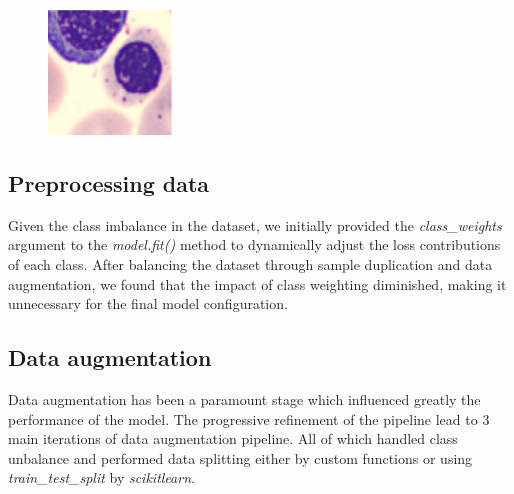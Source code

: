 \documentclass[11pt]{article}
\begin{document}
\begin{figure}[H]
\begin{minipage}{0.2\textwidth}
        \includegraphics[width=\linewidth]{images/ambiguous2.png}
    \end{minipage}
\end{figure}

\subsection{Preprocessing data}

Given the class imbalance in the dataset, we initially provided the \textit{class\_weights} argument to the \textit{model.fit()} method to dynamically adjust the loss contributions of each class. After balancing the dataset through sample duplication and data augmentation, we found that the impact of class weighting diminished, making it unnecessary for the final model configuration.

\subsection{Data augmentation}

Data augmentation has been a paramount stage which influenced greatly the performance of the model.
The progressive refinement of the pipeline lead to 3 main iterations of data augmentation pipeline.
All of which handled class unbalance and performed data splitting either by custom functions or using \textit{train\_test\_split} by \textit{scikit\-learn}.
\end{document}

